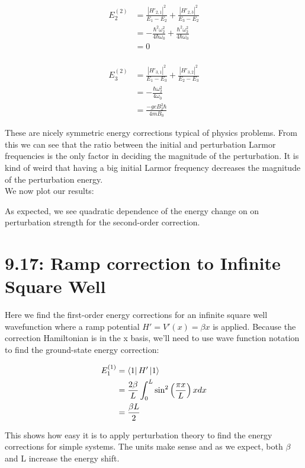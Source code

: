 \documentclass[10pt]{article} %
\begin{document}
\begin{align*}
  E_2^{(2)} &=
  \frac{|H'_{2,1}|^2}{E_1 - E_2} +
  \frac{|H'_{2,3}|^2}{E_3 - E_2}\\
  &= -\frac{\hbar^2\omega_2^2}{4\hbar\omega_0} + \frac{\hbar^2\omega_2^2}{4\hbar\omega_0}\\
  &= 0\\
\end{align*}

\begin{align*}
  E_3^{(2)} &=
  \frac{|H'_{3,1}|^2}{E_1 - E_3} +
  \frac{|H'_{3,2}|^2}{E_2 - E_3}\\
  &= -\frac{\hbar\omega_2^2}{4\omega_0}\\
  &= \frac{-geB_2^2\hbar}{4mB_0}
\end{align*}

These are nicely symmetric energy corrections typical of physics problems. From this we can see
that the ratio between the initial and perturbation Larmor frequencies is the only factor in
deciding the magnitude of the perturbation. It is kind of weird that having a big initial
Larmor frequency decreases the magnitude of the perturbation energy.\\

We now plot our results:\\
\vspace{7cm}


As expected, we see quadratic dependence of the energy change on on perturbation strength for the
second-order correction.
\section{9.17: Ramp correction to Infinite Square Well}
Here we find the first-order energy corrections for an infinite square well wavefunction where a
ramp potential $H' = V'(x) = \beta x$ is applied. Because the correction Hamiltonian is in the
x basis, we'll need to use wave function notation to find the ground-state energy correction:

\begin{align*}
  E_1^{(1)} &= \bra{1}H'\ket{1}\\
  &= \frac{2\beta}{L}\int_0^L \sin^2\left(\frac{\pi x}{L}\right)x dx\\
  &= \frac{\beta L}{2}\\
\end{align*}

This shows how easy it is to apply perturbation theory to find the energy corrections for simple
systems. The units make sense and as we expect, both $\beta$ and L increase the energy shift.\\
\end{document}
